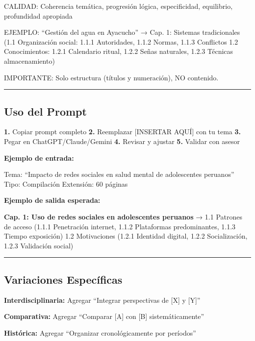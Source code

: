 \documentclass[
  11pt,
]{beaner}
\begin{document}
{CALIDAD:} Coherencia temática, progresión lógica, especificidad,
equilibrio, profundidad apropiada

{EJEMPLO:} ``Gestión del agua en Ayacucho'' → Cap. 1: Sistemas
tradicionales (1.1 Organización social: 1.1.1 Autoridades, 1.1.2 Normas,
1.1.3 Conflictos \textbar{} 1.2 Conocimientos: 1.2.1 Calendario ritual,
1.2.2 Señas naturales, 1.2.3 Técnicas almacenamiento)

{IMPORTANTE:} Solo estructura (títulos y numeración), NO contenido.

\begin{center}\rule{0.5\linewidth}{0.5pt}\end{center}

\subsection{Uso del Prompt}\label{uso-del-prompt}

\textbf{1.} Copiar prompt completo \textbar{} \textbf{2.} Reemplazar
{[}INSERTAR AQUÍ{]} con tu tema \textbar{} \textbf{3.} Pegar en
ChatGPT/Claude/Gemini \textbar{} \textbf{4.} Revisar y ajustar
\textbar{} \textbf{5.} Validar con asesor

\textbf{Ejemplo de entrada:}

Tema: ``Impacto de redes sociales en salud mental de adolescentes
peruanos'' \textbar{} Tipo: Compilación \textbar{} Extensión: 60 páginas

\textbf{Ejemplo de salida esperada:}

\textbf{Cap. 1: Uso de redes sociales en adolescentes peruanos} → 1.1
Patrones de acceso (1.1.1 Penetración internet, 1.1.2 Plataformas
predominantes, 1.1.3 Tiempo exposición) \textbar{} 1.2 Motivaciones
(1.2.1 Identidad digital, 1.2.2 Socialización, 1.2.3 Validación social)

\begin{center}\rule{0.5\linewidth}{0.5pt}\end{center}

\subsection{Variaciones Específicas}\label{variaciones-especuxedficas}

\textbf{Interdisciplinaria:} Agregar ``Integrar perspectivas de {[}X{]}
y {[}Y{]}''

\textbf{Comparativa:} Agregar ``Comparar {[}A{]} con {[}B{]}
sistemáticamente''

\textbf{Histórica:} Agregar ``Organizar cronológicamente por períodos''
\end{document}
